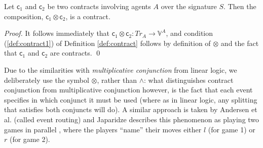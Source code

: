 \documentclass[orivec,final]{llncs-href}
\newcommand{\traceset}[1]{\mathit{Tr}_{#1}}
\newcommand{\verdictset}[1]{\mathbb{V}^{#1}}
\newcommand{\contractset}[1]{\traceset{#1} \to \verdictset{#1}}
\newcommand{\contract}{\mathsf{c}}
\begin{document}
\begin{lemma}
  Let $\contract_1$ and $\contract_2$ be two contracts involving
  agents $A$ over the signature $S$. Then the composition,
  $\contract_1 \otimes \contract_2$, is a contract.
\end{lemma}
\begin{proof}
  It follows immediately that $\contract_1 \otimes \contract_2 :
  \contractset{A}$, and condition (\ref{def:contract1}) of Definition
  \ref{def:contract} follows by definition of $\otimes$ and the fact
  that $\contract_1$ and $\contract_2$ are contracts.
  \qed
\end{proof}

Due to the similarities with \emph{multiplicative conjunction} from
linear logic, we deliberately use the symbol $\otimes$, rather than
$\land$: what distinguishes contract conjunction from multiplicative
conjunction however, is the fact that each event specifies in which
conjunct it must be used (where as in linear logic, any splitting that
satisfies both conjuncts will do). A similar approach is taken by
Andersen et al. \cite{andersen06contracts} (called
event routing) and Japaridze describes this
phenomenon as playing two games in parallel
\cite{japaridze02logicofgames}, where the players ``name'' their moves
either $l$ (for game 1) or $r$ (for game 2).

~
\end{document}
